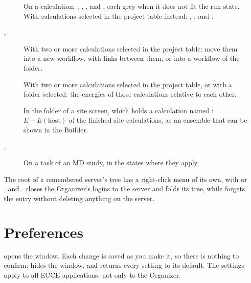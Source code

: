 \begin{description}
	\item[] On a calculation: , , ,  and , each grey when it does not fit the run state. With calculations selected in the project table instead: , ,  and .
	\item[, ] With two or more calculations selected in the project table: move them into a new workflow, with links between them, or into a workflow of the folder.
	\item[] With two or more calculations selected in the project table, or with a folder selected: the energies of those calculations relative to each other.
	\item[] In the folder of a site screen, which holds a calculation named : $E - E(\mathrm{host})$ of the finished site calculations, as an ensemble that can be shown in the Builder.
	\item[, ] On a task of an MD study, in the states where they apply.
\end{description}
The root of a remembered server's tree has a right-click menu of its own, with  or , and .  closes the Organizer's logins to the server and folds its tree, while  forgets the entry without deleting anything on the server.

\section{Preferences}
\label{sec:org-prefs}
 opens the  window. Each change is saved as you make it, so there is nothing to confirm:  hides the window, and  returns every setting to its default. The settings apply to all ECCE applications, not only to the Organizer.


